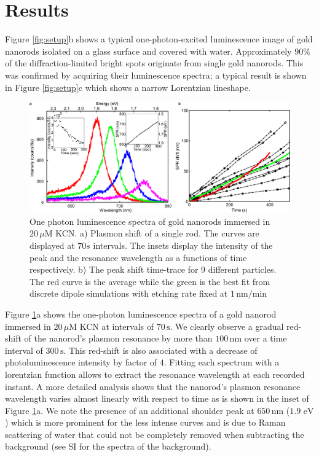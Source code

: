 \documentclass[a4paper,oneside,onecolumn]{article}
\newcommand{\nm}{\ensuremath{\,\textrm{nm}}}
\newcommand{\eV}{\ensuremath{\,\textrm{eV}}}
\newcommand{\uM}{\ensuremath{\,\mu\textrm{M}}}
\begin{document}
\section{Results}

Figure \ref{fig:setup}b shows a typical one-photon-excited luminescence image
of gold nanorods isolated on a glass surface and covered with water.
Approximately $90\%$ of the diffraction-limited bright spots originate from
single gold nanorods. This was confirmed by acquiring their luminescence
spectra; a typical result is shown in Figure \ref{fig:setup}c which shows
a narrow Lorentzian lineshape\cite{Funston2009}.

\begin{figure}[p]
 \centering
 \includegraphics[width=0.95\linewidth]{Figures/02_Experimental/Experimental.png}
 \caption{One photon luminescence spectra of gold nanorods immersed in $20\uM$
 KCN. a) Plasmon shift of a single rod. The curves are displayed at $70s$
 intervals. The insets display the intensity of the peak and the resonance
 wavelength as a functions of time respectively. b) The peak shift time-trace
 for 9 different particles. The red curve is the average while the green is the
 best fit from discrete dipole simulations with etching rate fixed at
 $1\nm/\textrm{min}$}
 \label{fig:plasmon_single_rod}
\end{figure}

Figure \ref{fig:plasmon_single_rod}a shows the one-photon luminescence spectra
of a gold nanorod immersed in $20\uM$ KCN at intervals of $70\,\text{s}$. We
clearly observe a gradual red-shift of the nanorod's plasmon resonance by more
than $100\nm$ over a time interval of $300\,\text{s}$. This red-shift is also
associated with a decrease of photoluminescence intensity by factor of $4$.
Fitting each spectrum with a lorentzian function allows to extract the resonance
wavelength at each recorded instant. A more detailed analysis shows that the
nanorod's plasmon resonance wavelength varies almost linearly with respect to
time as is shown in the inset of Figure \ref{fig:plasmon_single_rod}a. We note the presence of an
additional shoulder peak at $650\nm$ ($1.9\,\eV$) which is more prominent for
the less intense curves and is due to Raman scattering of water\cite{Snow1985}
that could not be completely removed when subtracting the background (see SI for
the spectra of the background).
\end{document}
